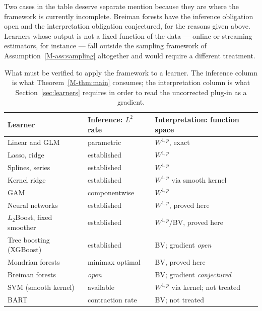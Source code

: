 \documentclass[12pt,a4paper]{article}
\numberwithin{equation}{section}
\theoremstyle{plain}
\theoremstyle{definition}
\begin{document}
	Two cases in the table deserve separate mention because they are where the
	framework is currently incomplete. Breiman forests have the inference obligation
	open and the interpretation obligation conjectured, for the reasons given above.
	Learners whose output is not a fixed function of the data --- online or
	streaming estimators, for instance --- fall outside the sampling framework of
	Assumption~\ref{M-ass:sampling} altogether and would require a different
	treatment.

\begin{table}[htbp]
	\centering
	\caption{What must be verified to apply the framework to a learner. The
		inference column is what Theorem~\ref{M-thm:main} consumes; the interpretation
		column is what Section~\ref{sec:learners} requires in order to read the
		uncorrected plug-in as a gradient.}
	\label{tab:learner_checklist}
	\begin{tabular}{lll}
		\toprule
		Learner & Inference: $L^2$ rate & Interpretation: function space \\
		\midrule
		Linear and GLM        & parametric        & $W^{1,p}$, exact \\
		Lasso, ridge          & established       & $W^{1,p}$ \\
		Splines, series       & established       & $W^{1,p}$ \\
		Kernel ridge          & established       & $W^{1,p}$ via smooth kernel \\
		GAM                   & componentwise     & $W^{1,p}$ \\
		Neural networks       & established       & $W^{1,p}$, proved here \\
		$L_2$Boost, fixed smoother & established  & $W^{1,p}$/BV, proved here \\
		Tree boosting (XGBoost) & established     & BV; gradient \emph{open} \\
		Mondrian forests      & minimax optimal   & BV, proved here \\
		Breiman forests       & \emph{open}       & BV; gradient \emph{conjectured} \\
		SVM (smooth kernel)   & available         & $W^{1,p}$ via kernel; not treated \\
		BART                  & contraction rate  & BV; not treated \\
		\bottomrule
	\end{tabular}
\end{table}


\end{document}
